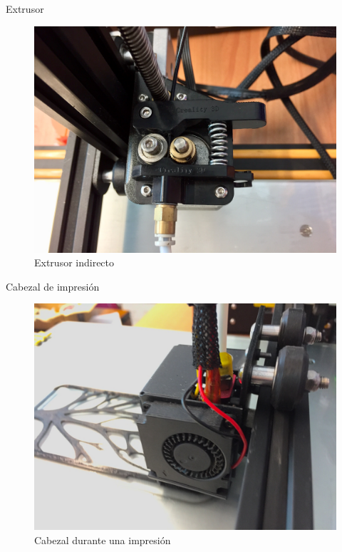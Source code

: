 \documentclass{beamer}
\begin{document}
	\begin{frame}{Extrusor}
		\begin{figure}
			\includegraphics[height=0.8\textheight]{images/extrusor}
			\caption{Extrusor indirecto}
		\end{figure}
	\end{frame}
	\begin{frame}{Cabezal de impresión}
		\begin{figure}
			\includegraphics[height=0.8\textheight]{images/cabezal}
			\caption{Cabezal durante una impresión}
		\end{figure}
	\end{frame}
\end{document}
